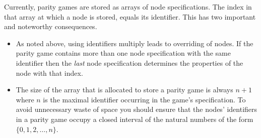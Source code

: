Currently, parity games are stored as arrays of node specifications. The index in that array at which
a node is stored, equals its identifier. This has two important and noteworthy consequences.
\begin{itemize}
\item As noted above, using identifiers multiply leads to overriding of nodes. If the parity game
      contains more than one node specification with the same identifier then the \emph{last} node
      specification determines the properties of the node with that index.
\item The size of the array that is allocated to store a parity game is always $n+1$ where $n$ is
      the maximal identifier occurring in the game's specification. To avoid unnecessary waste of
      space you should ensure that the nodes' identifiers in a parity game occupy a closed interval
      of the natural numbers of the form $\{0,1,2,\ldots,n\}$.
\end{itemize}



